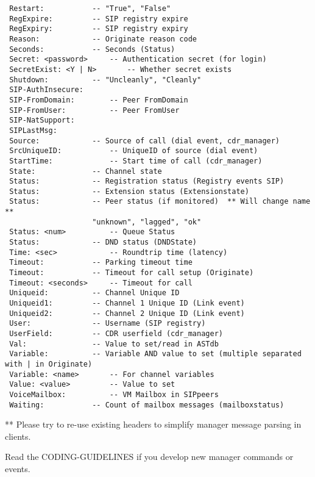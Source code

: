 \begin{verbatim}
 Restart:			-- "True", "False"
 RegExpire:			-- SIP registry expire
 RegExpiry:			-- SIP registry expiry
 Reason:			-- Originate reason code
 Seconds:			-- Seconds (Status)
 Secret: <password>		-- Authentication secret (for login)
 SecretExist: <Y | N>		-- Whether secret exists 
 Shutdown:			-- "Uncleanly", "Cleanly" 
 SIP-AuthInsecure:
 SIP-FromDomain:		-- Peer FromDomain
 SIP-FromUser:			-- Peer FromUser
 SIP-NatSupport:
 SIPLastMsg:
 Source:			-- Source of call (dial event, cdr_manager)
 SrcUniqueID:			-- UniqueID of source (dial event)
 StartTime: 			-- Start time of call (cdr_manager)
 State:				-- Channel state
 Status:			-- Registration status (Registry events SIP)
 Status:			-- Extension status (Extensionstate)
 Status:			-- Peer status (if monitored)  ** Will change name **
					"unknown", "lagged", "ok"
 Status: <num>			-- Queue Status
 Status:			-- DND status (DNDState)
 Time: <sec>			-- Roundtrip time (latency)
 Timeout:			-- Parking timeout time
 Timeout:			-- Timeout for call setup (Originate)
 Timeout: <seconds>		-- Timeout for call
 Uniqueid:			-- Channel Unique ID
 Uniqueid1:			-- Channel 1 Unique ID (Link event)
 Uniqueid2:			-- Channel 2 Unique ID (Link event)
 User:				-- Username (SIP registry)
 UserField:			-- CDR userfield (cdr_manager)
 Val:				-- Value to set/read in ASTdb
 Variable:			-- Variable AND value to set (multiple separated with | in Originate)
 Variable: <name>		-- For channel variables
 Value: <value>			-- Value to set
 VoiceMailbox:			-- VM Mailbox in SIPpeers
 Waiting:			-- Count of mailbox messages (mailboxstatus)
\end{verbatim}

 ** Please try to re-use existing headers to simplify manager message parsing in clients.

Read the CODING-GUIDELINES if you develop new manager commands or events.

